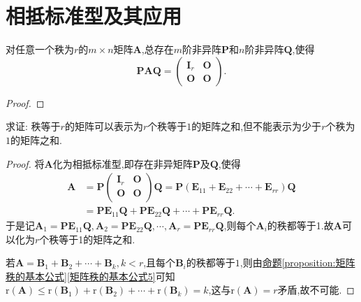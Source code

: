 \documentclass[../../main.tex]{subfiles}
\begin{document}
\section{相抵标准型及其应用}

\begin{theorem}[矩阵的相抵标准型]\label{theorem:矩阵的相抵标准型}
对任意一个秩为\(r\)的\(m\times n\)矩阵\(\boldsymbol{A}\),总存在\(m\)阶非异阵\(\boldsymbol{P}\)和\(n\)阶非异阵\(\boldsymbol{Q}\),使得
\[
\boldsymbol{P}\boldsymbol{A}\boldsymbol{Q}=\begin{pmatrix}
\boldsymbol{I}_r&\boldsymbol{O}\\
\boldsymbol{O}&\boldsymbol{O}
\end{pmatrix}.
\]
\end{theorem}
\begin{proof}


\end{proof}

\begin{proposition}[矩阵的秩1分解]\label{proposition:矩阵的秩1分解}
求证: 秩等于\(r\)的矩阵可以表示为\(r\)个秩等于\(1\)的矩阵之和,但不能表示为少于\(r\)个秩为\(1\)的矩阵之和.
\end{proposition}
\begin{proof}
将\(\boldsymbol{A}\)化为相抵标准型,即存在非异矩阵\(\boldsymbol{P}\)及\(\boldsymbol{Q}\),使得
\begin{align*}
\boldsymbol{A}&=\boldsymbol{P}\left( \begin{matrix}
\boldsymbol{I}_r&		\boldsymbol{O}\\
\boldsymbol{O}&		\boldsymbol{O}\\
\end{matrix} \right) \boldsymbol{Q}=\boldsymbol{P}\left( \boldsymbol{E}_{11}+\boldsymbol{E}_{22}+\cdots +\boldsymbol{E}_{rr} \right) \boldsymbol{Q}
\\
&=\boldsymbol{PE}_{11}\boldsymbol{Q}+\boldsymbol{PE}_{22}\boldsymbol{Q}+\cdots +\boldsymbol{PE}_{rr}\boldsymbol{Q}.
\end{align*}
于是记$\boldsymbol{A}_1=\boldsymbol{PE}_{11}\boldsymbol{Q},\boldsymbol{A}_2=\boldsymbol{PE}_{22}\boldsymbol{Q},\cdots ,\boldsymbol{A}_r=\boldsymbol{PE}_{rr}\boldsymbol{Q}$,则每个$\boldsymbol{A}_i$的秩都等于1.故$\boldsymbol{A}$可以化为$r$个秩等于1的矩阵之和.

若\(\boldsymbol{A}=\boldsymbol{B}_1+\boldsymbol{B}_2+\cdots+\boldsymbol{B}_k,k < r\),且每个\(\boldsymbol{B}_i\)的秩都等于\(1\),则由\hyperref[矩阵秩的基本公式5]{命题\ref{proposition:矩阵秩的基本公式}\ref{矩阵秩的基本公式5}}可知\(\mathrm{r}(\boldsymbol{A})\leqslant \mathrm{r}(\boldsymbol{B}_1)+\mathrm{r}(\boldsymbol{B}_2)+\cdots+\mathrm{r}(\boldsymbol{B}_k)=k\),这与\(\mathrm{r}(\boldsymbol{A}) = r\)矛盾,故不可能.

\end{proof}
\end{document}
